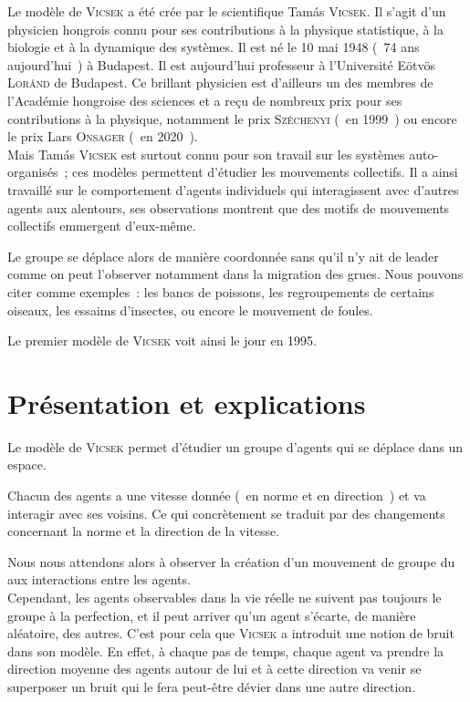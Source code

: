 \documentclass[french, a4paper, 12pt, openany]{report}
\begin{document}
	Le modèle de \textsc{Vicsek} a été crée par le scientifique Tamás \textsc{Vicsek}. Il s'agit d'un physicien hongrois connu pour ses contributions à la physique statistique, à la biologie et à la dynamique des systèmes. Il est né le 10 mai 1948 (~74 ans aujourd'hui~) à Budapest. Il est aujourd'hui professeur à l'Université Eötvös \textsc{Loránd} de Budapest. Ce brillant physicien est d'ailleurs un des membres de l'Académie hongroise des sciences et a reçu de nombreux prix pour ses contributions à la physique, notamment le prix \textsc{Széchenyi} (~en 1999~) ou encore le prix Lars \textsc{Onsager} (~en 2020~). \\

	Mais Tamás \textsc{Vicsek} est surtout connu pour son travail sur les systèmes auto-organisés~; ces modèles permettent d'étudier les mouvements collectifs. Il a ainsi travaillé sur le comportement d'agents individuels qui interagissent avec d'autres agents aux alentours, ses observations montrent que des motifs de mouvements collectifs emmergent d'eux-même.
	
	Le groupe se déplace alors de manière coordonnée sans qu'il n'y ait de leader comme on peut l'observer notamment dans la migration des grues. Nous pouvons citer comme exemples~: les bancs de poissons, les regroupements de certains oiseaux, les essaims d'insectes, ou encore le mouvement de foules.

	 Le premier modèle de \textsc{Vicsek} voit ainsi le jour en 1995.\\
	 
	
\chapter{Présentation et explications}	

	Le modèle de \textsc{Vicsek} permet d'étudier un groupe d'agents qui se déplace dans un espace.
	
	Chacun des agents a une vitesse donnée (~en norme et en direction~) et va interagir avec ses voisins. Ce qui concrètement se traduit par des changements concernant la norme et la direction de la vitesse.
	
	Nous nous attendons alors à observer la création d'un mouvement de groupe du aux interactions entre les agents. \\
	
	Cependant, les agents observables dans la vie réelle ne suivent pas toujours le groupe à la perfection, et il peut arriver qu'un agent s'écarte, de manière aléatoire, des autres. C'est pour cela que \textsc{Vicsek} a introduit une notion de bruit dans son modèle. En effet, à chaque pas de temps, chaque agent va prendre la direction moyenne des agents autour de lui et à cette direction va venir se superposer un bruit qui le fera peut-être dévier dans une autre direction.
	
\end{document}
